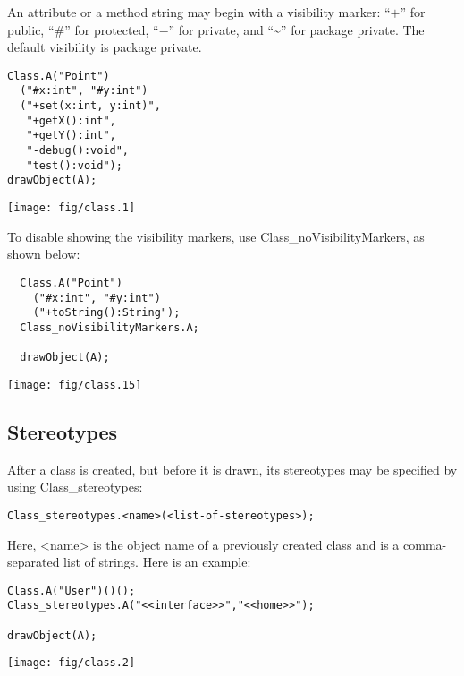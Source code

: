 \documentclass{article}
\newcommand{\code}{\ttfamily}
\begin{document}
An attribute or a method string may begin with a visibility marker: ``$+$'' for
public, ``\#'' for protected, ``$-$'' for private, and ``\textasciitilde'' for package private. 
The default visibility is package private.

\begin{multicols}{2}
\begin{verbatim}
Class.A("Point")
  ("#x:int", "#y:int")
  ("+set(x:int, y:int)",
   "+getX():int",
   "+getY():int",
   "-debug():void",
   "test():void");
drawObject(A);
\end{verbatim}
\columnbreak
\texttt{[image: fig/class.1]}
\end{multicols}

To disable showing the visibility markers, use {\code Class\_noVisibilityMarkers}, as shown below:

\begin{multicols}{2}
\begin{verbatim}
  Class.A("Point")
    ("#x:int", "#y:int")
    ("+toString():String");
  Class_noVisibilityMarkers.A;

  drawObject(A);
\end{verbatim}
\columnbreak
\texttt{[image: fig/class.15]}
\end{multicols}

\subsection{Stereotypes}

After a class is created, but before it is drawn, its stereotypes may be specified by using {\code Class\_stereotypes}:

\begin{verbatim}
Class_stereotypes.<name>(<list-of-stereotypes>);
\end{verbatim}

Here, {\code <name>} is the object name of a previously created class and {\code <list-of-stereotypes>}
is a comma-separated list of strings. Here is an example:

\begin{multicols}{2}
\begin{verbatim}
Class.A("User")()();
Class_stereotypes.A("<<interface>>","<<home>>");

drawObject(A);
\end{verbatim}
\columnbreak
\hspace{3cm}\texttt{[image: fig/class.2]}
\end{multicols}
\end{document}
